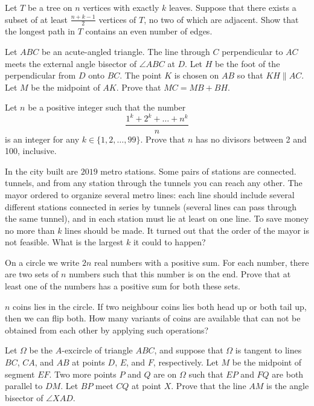 \documentclass[11pt]{scrartcl}
\begin{document}
\begin{problem}[521969466382456]
	Let $T$ be a tree on $n$ vertices with exactly $k$ leaves. Suppose that there exists a subset of at least $\frac{n+k-1}{2}$ vertices of $T$, no two of which are adjacent. Show that the longest path in $T$ contains an even number of edges. 
\end{problem}
\begin{problem}[5441518070935718077]
	Let $ABC$ be an acute-angled triangle. The line through $C$ perpendicular to $AC$ meets the external angle bisector of $\angle ABC$ at $D$. Let $H$ be the foot of the perpendicular from $D$ onto $BC$. The point $K$ is chosen on $AB$ so that $KH \parallel AC$. Let $M$ be the midpoint of $AK$. Prove that $MC = MB + BH$.
\end{problem}
\begin{problem}[4306507392377162131]
Let $n$ be a positive integer such that the number
\[\frac{1^k + 2^k + \dots + n^k}{n}\]is an integer for any $k \in \{1, 2, \dots, 99\}$. Prove that $n$ has no divisors between 2 and 100, inclusive.
\end{problem}
\begin{problem}[175452544956824]
In the city built are $2019$ metro stations. Some pairs of stations are connected. tunnels, and from any station through the tunnels you can reach any other. The mayor ordered to organize several metro lines: each line should include several different stations connected in series by tunnels (several lines can pass through the same tunnel), and in each station must lie at least on one line. To save money no more than $k$ lines should be made. It turned out that the order of the mayor is not feasible. What is the largest $k$ it could to happen?
\end{problem}
\begin{problem}[1011347878697645666]
  On a circle we write $2n$ real numbers with a positive sum.
  For each number, there are two sets of $n$ numbers such that this number is on the end.
  Prove that at least one of the numbers has a positive sum for both these sets.
\end{problem}
\begin{problem}[937132258882447]
	$n$ coins lies in the circle. If two neighbour coins lies both head up or both tail up, then we can flip both. How many variants of coins are available that can not be obtained from each other by applying such operations?
\end{problem}
\begin{problem}[6566259136811987209]
	Let $\Omega$ be the $A$-excircle of triangle $ABC$, and suppose that $\Omega$ is tangent to lines $BC$, $CA$, and $AB$ at points $D$, $E$, and $F$, respectively. Let $M$ be the midpoint of segment $EF$. Two more points $P$ and $Q$ are on $\Omega$ such that $EP$ and $FQ$ are both parallel to $DM$. Let $BP$ meet $CQ$ at point $X$. Prove that the line $AM$ is the angle bisector of $\angle XAD$.
\end{problem}
\end{document}
